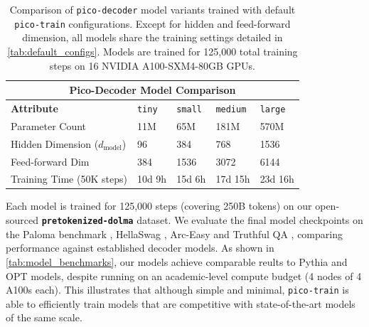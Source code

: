\begin{table}[h!]
    \centering
    \renewcommand{\arraystretch}{1.2}
    \begin{tabular}{|p{}||p{}|p{}|p{}|p{}|}
    \hline
    \multicolumn{5}{|c|}{\textbf{Pico-Decoder Model Comparison}} \\
    \hline
    \textbf{Attribute} & \texttt{tiny} & \texttt{small} & \texttt{medium} & \texttt{large} \\
    \hline
    Parameter Count & 11M & 65M & 181M & 570M \\
    Hidden Dimension ($d_{\text{model}}$) & 96 & 384 & 768 & 1536 \\
    Feed-forward Dim & 384 & 1536 & 3072 & 6144 \\
    Training Time (50K steps) & 10d 9h & 15d 6h & 17d 15h & 23d 16h \\
    \hline
    \end{tabular}
    \vspace{0.5em}
    \caption{Comparison of \texttt{pico-decoder} model variants trained with default \texttt{pico-train} configurations. Except for hidden and feed-forward dimension, all models share the training settings detailed in \cref{tab:default_configs}. Models are trained for 125,000 total training steps on 16 NVIDIA A100-SXM4-80GB GPUs.}
    \label{tab:pico-decoder-configs}
    \end{table}

Each model is trained for 125,000 steps (covering 250B tokens) on our open-sourced \textbf{\texttt{pretokenized-dolma}} dataset. We evaluate the final model checkpoints on the Paloma benchmark \citep{magnusson2024paloma}, HellaSwag \citep{zellers2019hellaswag}, Arc-Easy \citep{clark2018arc} and Truthful QA \citep{lin2022truthfulqa}, comparing performance against established decoder models. As shown in \cref{tab:model_benchmarks}, our models achieve comparable reults to Pythia and OPT models, despite running on an academic-level compute budget (4 nodes of 4 A100s each). This illustrates that although simple and minimal, \texttt{pico-train} is able to efficiently train models that are competitive with state-of-the-art models of the same scale.

